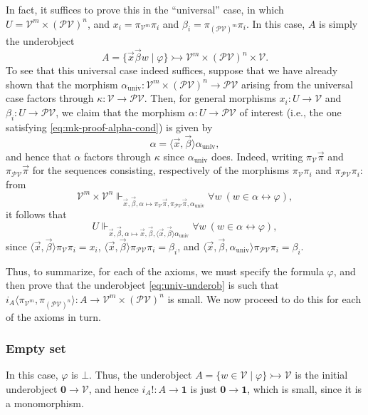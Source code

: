 \documentclass{amsart}
\newcommand\br[1]{\langle{}#1\rangle{}}
\newcommand\cV{\mathcal{V}}
\renewcommand\phi{\varphi}
\newcommand\pow{\mathcal{P}}
\newcommand\set[2][]{#1\{ #2 #1\}}
\newcommand\tm{\mathbf{1}}
\newcommand\tot{\leftrightarrow}
\newcommand\tto{\rightarrowtail}
\newcommand\unex{{!}}
\newcommand\univ{\mathrm{univ}}
\newcommand\vek[1]{{\vec{#1}}}
\newcommand\vx{\vek{x}}
\newcommand\zset{\mathbf{0}}
\theoremstyle{definition}
\theoremstyle{remark}
\theoremstyle{plainwithref}
\begin{document}
In fact, it suffices to prove this in the ``universal'' case, in which \( U = \cV^m \times (\pow \cV)^n \), and \( x_i = \pi_{\cV^m} \pi_i \) and \( \beta_i = \pi_{(\pow \cV)^m} \pi_i \).
In this case, \( A \) is simply the underobject
\begin{equation} \label{eq:univ-underob}
  A = \set{ \vx \vek \beta w \mid \phi } \tto \cV^m \times (\pow \cV)^n \times \cV.
\end{equation}
To see that this universal case indeed suffices, suppose that we have already shown that the morphism \( \alpha_{\univ} \colon \cV^m \times (\pow \cV)^n \to \pow \cV \) arising from the universal case factors through \( \kappa \colon \cV \to \pow \cV \).
Then, for general morphisms \( x_i \colon U \to \cV \) and \( \beta_i \colon U \to \pow \cV \), we claim that the morphism \( \alpha \colon U \to \pow \cV \) of interest (i.e., the one satisfying \eqref{eq:mk-proof-alpha-cond}) is given by
\[
  \alpha = \br{\vx, \vek \beta} \alpha_{\univ},
\]
and hence that \( \alpha \) factors through \( \kappa \) since \( \alpha_{\univ} \) does.
Indeed, writing \( \pi_\cV \vek \pi \) and \( \pi_{\pow \cV} \vek \pi \) for the sequences consisting, respectively of the morphisms \( \pi_{\cV} \pi_i \) and \( \pi_{\pow \cV} \pi_i \): from
\[
  \cV^m \times \cV^n \Vdash_{\vx, \vek \beta, \alpha \mapsto \pi_\cV \vek \pi,\pi_{\pow \cV}\vek \pi, \alpha_{\univ}} \forall w\ (w \in \alpha \tot \phi),
\]
it follows that
\[
  U \Vdash_{\vx, \vek \beta, \alpha \mapsto \vx,\vek \beta,\br{\vx, \vek \beta} \alpha_\univ} \forall w\ (w \in \alpha \tot \phi),
\]
since \( \br{\vx, \vek \beta} \pi_{\cV} \pi_i = x_i \), \( \br{\vx, \vek \beta} \pi_{\pow \cV} \pi_i = \beta_i \), and \( \br{\vx, \vek \beta, \alpha_{\univ}} \pi_{\pow \cV} \pi_i = \beta_i \).

Thus, to summarize, for each of the axioms, we must specify the formula \( \phi \), and then prove that the underobject \eqref{eq:univ-underob} is such that \( i_A \br{\pi_{\cV^m}, \pi_{(\pow \cV)^n}} \colon A \to \cV^m \times (\pow \cV)^n \) is small.
We now proceed to do this for each of the axioms in turn.

\subsubsection{Empty set}
In this case, \( \phi \) is \( \bot \).
Thus, the underobject \( A = \set{w \in \cV \mid \phi} \tto \cV \) is the initial underobject \( \zset \to \cV \), and hence \( i_A \unex \colon A \to \tm \) is just \( \zset \to \tm \), which is small, since it is a monomorphism.
\end{document}

